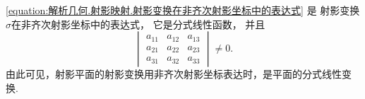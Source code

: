 \cref{equation:解析几何.射影映射.射影变换在非齐次射影坐标中的表达式} 是
射影变换\(\sigma\)在非齐次射影坐标中的表达式，
它是分式线性函数，
并且\begin{equation*}
	\begin{vmatrix}
		a_{11} & a_{12} & a_{13} \\
		a_{21} & a_{22} & a_{23} \\
		a_{31} & a_{32} & a_{33}
	\end{vmatrix}
	\neq 0.
\end{equation*}
由此可见，射影平面的射影变换用非齐次射影坐标表达时，是平面的分式线性变换.
